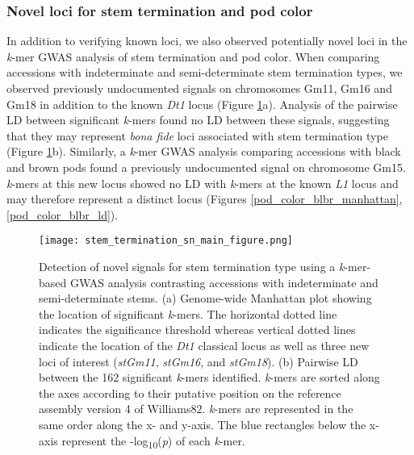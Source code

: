 \subsubsection*{Novel loci for stem termination and pod color}
\label{sv-gwas-main-results-novel-loci}

In addition to verifying known loci, we also observed potentially novel loci in
the \textit{k}-mer GWAS analysis of stem termination and pod color.
When comparing accessions
with indeterminate and semi-determinate stem termination types, we observed
previously undocumented signals on chromosomes Gm11, Gm16 and Gm18 in
addition to the known \textit{Dt1} locus (Figure \ref{stem-termination-main-figure}a).
Analysis of the pairwise LD between significant \textit{k}-mers found no
LD between these signals, suggesting that they may represent \textit{bona fide}
loci associated with stem termination type
(Figure \ref{stem-termination-main-figure}b). Similarly, a \textit{k}-mer GWAS
analysis comparing accessions with black and brown pods found a previously
undocumented signal on chromosome Gm15. \textit{k}-mers at this new locus showed no LD with \textit{k}-mers
at the known \textit{L1} locus and may therefore represent a distinct locus (Figures
\ref{pod_color_blbr_manhattan}, \ref{pod_color_blbr_ld}).

\begin{figure}
	\centering
	\texttt{[image: stem\_termination\_sn\_main\_figure.png]}
	\caption[Detection of novel signals for stem termination type
	using a \textit{k}-mer GWAS analysis contrasting accessions with
	indeterminate and semi-determinate stems]{Detection of novel signals for stem termination type
	using a \textit{k}-mer-based GWAS analysis contrasting accessions with
	indeterminate and semi-determinate stems.
	(a) Genome-wide Manhattan plot showing the location of significant \textit{k}-mers.
	The horizontal dotted line indicates the significance threshold
	whereas vertical dotted lines indicate the location of the \textit{Dt1}
	classical locus as well as three new loci of interest (\textit{stGm11},
	\textit{stGm16}, and \textit{stGm18}).
	(b) Pairwise LD between the 162 significant \textit{k}-mers identified.
	\textit{k}-mers are sorted along the axes according to their
	putative position on the reference assembly version 4 of Williams82.
	\textit{k}-mers are
	represented in the same order along the x- and y-axis. The blue
	rectangles below the x-axis represent the
	-log\textsubscript{10}(\textit{p}) of each \textit{k}-mer.}
	\label{stem-termination-main-figure}
\end{figure}

